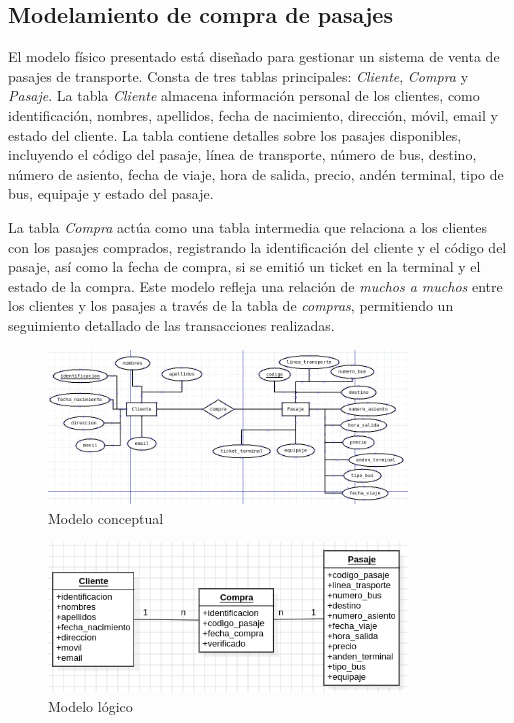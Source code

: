 \documentclass[12pt]{article}
\begin{document}
                
                
                \subsection{Modelamiento de compra de pasajes}
                        El modelo físico presentado está diseñado para gestionar un sistema de venta de pasajes de transporte. Consta de tres tablas principales: \textit{Cliente}, \textit{Compra} y \textit{Pasaje}. La tabla \textit{Cliente} almacena información personal de los clientes, como identificación, nombres, apellidos, fecha de nacimiento, dirección, móvil, email y estado del cliente. La tabla \textit{} contiene detalles sobre los pasajes disponibles, incluyendo el código del pasaje, línea de transporte, número de bus, destino, número de asiento, fecha de viaje, hora de salida, precio, andén terminal, tipo de bus, equipaje y estado del pasaje. 
                        
                        La tabla \textit{Compra} actúa como una tabla intermedia que relaciona a los clientes con los pasajes comprados, registrando la identificación del cliente y el código del pasaje, así como la fecha de compra, si se emitió un ticket en la terminal y el estado de la compra. Este modelo refleja una relación de \textit{muchos a muchos} entre los clientes y los pasajes a través de la tabla de \textit{compras}, permitiendo un seguimiento detallado de las transacciones realizadas.
                        
                        \newpage
                        \begin{figure}[!h]
                                \centering
                                \includegraphics[width=0.85\textwidth]{img/ej2-1.png}
                                \caption{Modelo conceptual}
                        \end{figure}

                        \begin{figure}[!h]
                                \centering
                                \includegraphics[width=0.85\textwidth]{img/ej2-2.png}
                                \caption{Modelo lógico}
                        \end{figure}
\end{document}
